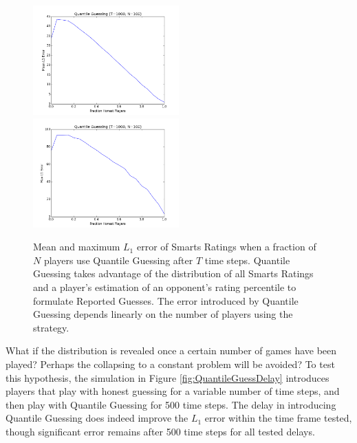 \begin{figure}[H]
\centerline{%
\includegraphics[width=0.5\textwidth]{figures/robustness/Quantile_Guessing31.png}%
\includegraphics[width=0.5\textwidth] {figures/robustness/Quantile_Guessing32.png}%
}%
\caption{Mean and maximum $L_1$ error of Smarts Ratings when a fraction of $N$ players use Quantile Guessing after $T$ time steps. Quantile Guessing takes advantage of the distribution of all Smarts Ratings and a player's estimation of an opponent's rating percentile to formulate Reported Guesses. The error introduced by Quantile Guessing depends linearly on the number of players using the strategy.}
\label{fig:QuantileGuessFrac}
\end{figure}

What if the distribution is revealed once a certain number of games have been played? Perhaps the collapsing to a constant problem will be avoided? To test this hypothesis, the simulation in Figure \ref{fig:QuantileGuessDelay} introduces players that play with honest guessing for a variable number of time steps, and then play with Quantile Guessing for 500 time steps. The delay in introducing Quantile Guessing does indeed improve the $L_1$ error within the time frame tested, though significant error remains after 500 time steps for all tested delays. 

